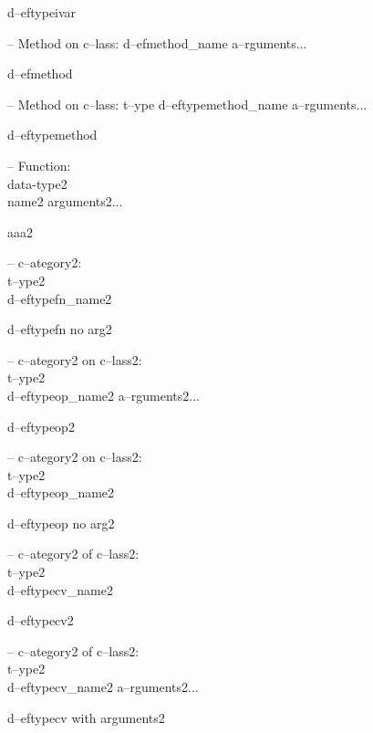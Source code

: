 \documentclass{book}
\begin{document}
%
d--eftypeivar

\hbox{}-- Method on c--lass: d--efmethod\_name a--rguments...


%
d--efmethod

\hbox{}-- Method on c--lass: t--ype d--eftypemethod\_name a--rguments...


%
d--eftypemethod


\hbox{}-- Function:\leavevmode{}\\data-type2\leavevmode{}\\name2 arguments2...


%
aaa2

\hbox{}-- c--ategory2:\leavevmode{}\\t--ype2\leavevmode{}\\d--eftypefn\_name2


%
d--eftypefn no arg2

\hbox{}-- c--ategory2 on c--lass2:\leavevmode{}\\t--ype2\leavevmode{}\\d--eftypeop\_name2 a--rguments2...


%
d--eftypeop2

\hbox{}-- c--ategory2 on c--lass2:\leavevmode{}\\t--ype2\leavevmode{}\\d--eftypeop\_name2


%
d--eftypeop no arg2

\hbox{}-- c--ategory2 of c--lass2:\leavevmode{}\\t--ype2\leavevmode{}\\d--eftypecv\_name2


%
d--eftypecv2

\hbox{}-- c--ategory2 of c--lass2:\leavevmode{}\\t--ype2\leavevmode{}\\d--eftypecv\_name2 a--rguments2...


%
d--eftypecv with arguments2
\end{document}
